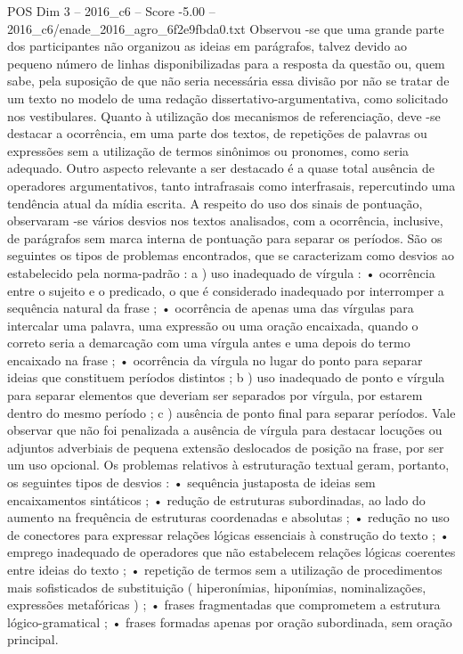 \begin{textsample}{POS Dim 3 – 2016\_c6 – Score -5.00 – 2016\_c6/enade\_2016\_agro\_6f2e9fbda0.txt}
Observou -se que uma grande parte dos participantes não organizou as ideias em parágrafos, talvez devido ao pequeno número de linhas disponibilizadas para a resposta da questão ou, quem sabe, pela suposição de que não seria necessária essa divisão por não se tratar de um texto no modelo de uma redação dissertativo-argumentativa, como solicitado nos vestibulares.
Quanto à utilização dos mecanismos de referenciação, deve -se destacar a ocorrência, em uma parte dos textos, de repetições de palavras ou expressões sem a utilização de termos sinônimos ou pronomes, como seria adequado.
Outro aspecto relevante a ser destacado é a quase total ausência de operadores argumentativos, tanto intrafrasais como interfrasais, repercutindo uma tendência atual da mídia escrita.
A respeito do uso dos sinais de pontuação, observaram -se vários desvios nos textos analisados, com a ocorrência, inclusive, de parágrafos sem marca interna de pontuação para separar os períodos.
São os seguintes os tipos de problemas encontrados, que se caracterizam como desvios ao estabelecido pela norma-padrão : a ) uso inadequado de vírgula : • ocorrência entre o sujeito e o predicado, o que é considerado inadequado por interromper a sequência natural da frase ; • ocorrência de apenas uma das vírgulas para intercalar uma palavra, uma expressão ou uma oração encaixada, quando o correto seria a demarcação com uma vírgula antes e uma depois do termo encaixado na frase ; • ocorrência da vírgula no lugar do ponto para separar ideias que constituem períodos distintos ; b ) uso inadequado de ponto e vírgula para separar elementos que deveriam ser separados por vírgula, por estarem dentro do mesmo período ; c ) ausência de ponto final para separar períodos.
Vale observar que não foi penalizada a ausência de vírgula para destacar locuções ou adjuntos adverbiais de pequena extensão deslocados de posição na frase, por ser um uso opcional.
Os problemas relativos à estruturação textual geram, portanto, os seguintes tipos de desvios : • sequência justaposta de ideias sem encaixamentos sintáticos ; • redução de estruturas subordinadas, ao lado do aumento na frequência de estruturas coordenadas e absolutas ; • redução no uso de conectores para expressar relações lógicas essenciais à construção do texto ; • emprego inadequado de operadores que não estabelecem relações lógicas coerentes entre ideias do texto ; • repetição de termos sem a utilização de procedimentos mais sofisticados de substituição ( hiperonímias, hiponímias, nominalizações, expressões metafóricas ) ; • frases fragmentadas que comprometem a estrutura lógico-gramatical ; • frases formadas apenas por oração subordinada, sem oração principal.

\end{textsample}
